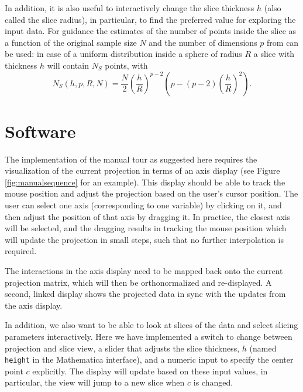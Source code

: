 \documentclass[]{interact}
\theoremstyle{plain}%
\theoremstyle{definition}
\theoremstyle{remark}
\begin{document}
In addition, it is also useful to interactively change the slice
thickness \(h\) (also called the slice radius), in particular, to find
the preferred value for exploring the input data. For guidance the
estimates of the number of points inside the slice as a function of the
original sample size \(N\) and the number of dimensions \(p\) from
\citet{sectionpursuit} can be used: in case of a uniform distribution
inside a sphere of radius \(R\) a slice with thickness \(h\) will
contain \(N_S\) points, with \begin{equation}
N_S(h, p, R, N) = \frac{N}{2} \left(\frac{h}{R}\right)^{p-2} \left(p - (p-2)\left(\frac{h}{R}\right)^{2}\right).
\label{eq:count}
\end{equation}

\hypertarget{sec:implementation}{%
\section{Software}\label{sec:implementation}}

The implementation of the manual tour as suggested here requires the
visualization of the current projection in terms of an axis display (see
Figure \ref{fig:manualsequence} for an example). This display should be
able to track the mouse position and adjust the projection based on the
user's cursor position. The user can select one axis (corresponding to
one variable) by clicking on it, and then adjust the position of that
axis by dragging it. In practice, the closest axis will be selected, and
the dragging results in tracking the mouse position which will update
the projection in small steps, such that no further interpolation is
required.

The interactions in the axis display need to be mapped back onto the
current projection matrix, which will then be orthonormalized and
re-displayed. A second, linked display shows the projected data in sync
with the updates from the axis display.

In addition, we also want to be able to look at slices of the data and
select slicing parameters interactively. Here we have implemented a
switch to change between projection and slice view, a slider that
adjusts the slice thickness, \(h\) (named \texttt{height} in the
Mathematica interface), and a numeric input to specify the center point
\(c\) explicitly. The display will update based on these input values,
in particular, the view will jump to a new slice when \(c\) is changed.
\end{document}
